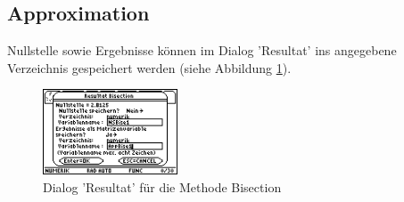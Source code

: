 \documentclass[
	a4paper							%
	,12pt							%
	,twoside						%
	,openright						%
]{scrreprt}							%
\begin{document}
\subsection{Approximation}
Nullstelle sowie Ergebnisse k\"onnen im Dialog 'Resultat’ ins angegebene Verzeichnis gespeichert werden (siehe Abbildung \ref{fig:ResultatApproximationBisection}).
\begin{figure}[h]
  \centering
  \includegraphics[width=4cm]{img/nummeth_image034.png}
  \caption{Dialog 'Resultat’ f\"ur die Methode Bisection}
  \label{fig:ResultatApproximationBisection}
\end{figure}

\end{document}
